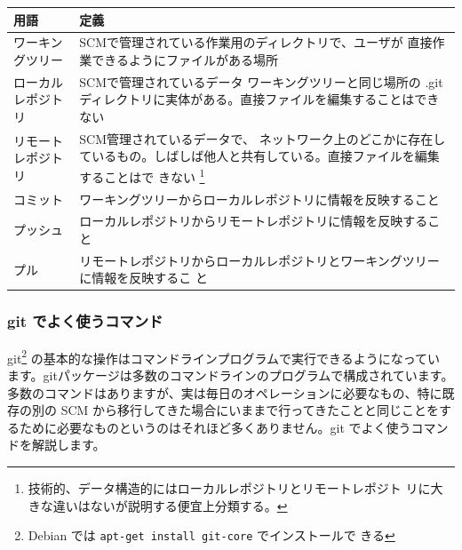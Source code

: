 \documentclass[mingoth,a4paper]{jsarticle}
\begin{document}
\begin{tabular}{|l|p{30em}|}
\hline
\hline
用語 & 定義 \\
\hline
 ワーキングツリー & SCMで管理されている作業用のディレクトリで、ユーザが
 直接作業できるようにファイルがある場所\\
\hline
 ローカルレポジトリ & SCMで管理されているデータ
 ワーキングツリーと同じ場所の
 .git ディレクトリに実体がある。直接ファイルを編集することはできない\\
\hline
 リモートレポジトリ & SCM管理されているデータで、
 ネットワーク上のどこかに存在し
 ているもの。しばしば他人と共有している。直接ファイルを編集することはで
 きない
 \footnote{技術的、データ構造的にはローカルレポジトリとリモートレポジト
 リに大きな違いはないが説明する便宜上分類する。}\\
\hline
 コミット & ワーキングツリーからローカルレポジトリに情報を反映すること\\
\hline
 プッシュ & ローカルレポジトリからリモートレポジトリに情報を反映するこ
 と\\
\hline
 プル & リモートレポジトリからローカルレポジトリとワーキングツリーに情報を反映するこ
 と\\
\hline
\hline
\end{tabular}
\subsubsection{git でよく使うコマンド}

git\footnote{Debian では {\tt apt-get install git-core} でインストールで
きる} の基本的な操作はコマンドラインプログラムで実行できるようになってい
ます。gitパッケージは多数のコマンドラインのプログラムで構成されています。
多数のコマンドはありますが、実は毎日のオペレーションに必要なもの、特に既
存の別の SCM から移行してきた場合にいままで行ってきたことと同じことをす
るために必要なものというのはそれほど多くありません。git でよく使うコマン
ドを解説します。
\end{document}

